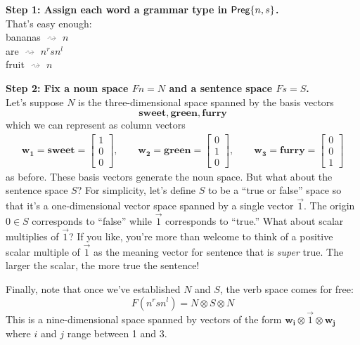 \documentclass{tufte-handout-tai}
\newcommand{\cat}[1]{{\normalfont\textsf{#1}}}
\theoremstyle{plain}
\theoremstyle{definition}
\theoremstyle{remark}
\begin{document}
\vspace{0.4cm}
\noindent\textbf{\large Step 1: Assign each word a grammar type in $\cat{Preg}\{n,s\}$.}\\[10pt]

\noindent That's easy enough:\\[0.3cm]
bananas \textcolor{gray}{$\rightsquigarrow$} $n$\\
are \textcolor{gray}{$\rightsquigarrow$} $n^rsn^l$\\
fruit \textcolor{gray}{$\rightsquigarrow$} $n$

\vspace{0.4cm}
\noindent \textbf{\large Step 2: Fix a noun space $Fn=N$ and a sentence space $Fs=S$.}\\[10pt]

\noindent Let's suppose $N$ is the three-dimensional space spanned by the basis vectors \[\mathbf{sweet}, \mathbf{green}, \mathbf{furry}\] which we can represent as column vectors
\begin{align*}
\mathbf{w_1}=\mathbf{sweet} = \begin{bmatrix}1\\0\\0\end{bmatrix},\qquad
\mathbf{w_2}=\mathbf{green} = \begin{bmatrix}0\\1\\0\end{bmatrix},\qquad
\mathbf{w_3}=\mathbf{furry} = \begin{bmatrix}0\\0\\1\end{bmatrix}
\end{align*}
as before. These basis vectors generate the noun space. But what about the sentence space $S$? For simplicity, let's define $S$ to be a ``true or false'' space so that it's a one-dimensional vector space spanned by a single vector $\vec{1}$. The origin $0\in S$ corresponds to ``false'' while  $\vec{1}$ corresponds to ``true.'' What about scalar multiplies of $\vec{1}$? If you like, you're more than welcome to think of a positive scalar multiple of $\vec{1}$ as the meaning vector for sentence that is \textit{super} true. The larger the scalar, the more true the sentence! 

Finally, note that once we've established $N$ and $S$, the verb space comes for free:
\[F(n^rsn^l)=N\otimes S\otimes N\]
This is a nine-dimensional space spanned by vectors of the form $\mathbf{w_i}\otimes\vec{1}\otimes\mathbf{w_j}$ where $i$ and $j$ range between 1 and 3.
\end{document}
